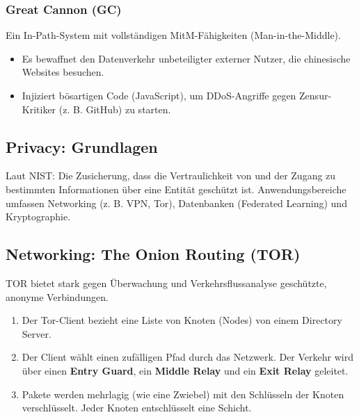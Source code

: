 \documentclass[
../../css_summary.tex,
]{subfiles}
\begin{document}
\subsubsection{Great Cannon (GC)}
Ein In-Path-System mit vollständigen MitM-Fähigkeiten (Man-in-the-Middle).
\begin{itemize}
  \item Es bewaffnet den Datenverkehr unbeteiligter externer Nutzer, die chinesische Websites besuchen.
  \item Injiziert bösartigen Code (JavaScript), um DDoS-Angriffe gegen Zensur-Kritiker (z. B. GitHub) zu starten.
\end{itemize}

\subsection{Privacy: Grundlagen}

\begin{defbox}[Privacy]
  Laut NIST: Die Zusicherung, dass die Vertraulichkeit von und der Zugang zu bestimmten Informationen über eine Entität geschützt ist. Anwendungsbereiche umfassen Networking (z. B. VPN, Tor), Datenbanken (Federated Learning) und Kryptographie.
\end{defbox}

\subsection{Networking: The Onion Routing (TOR)}

TOR bietet stark gegen Überwachung und Verkehrsflussanalyse geschützte, anonyme Verbindungen.

\begin{defbox}
  \begin{enumerate}
    \item Der Tor-Client bezieht eine Liste von Knoten (Nodes) von einem Directory Server.
    \item Der Client wählt einen zufälligen Pfad durch das Netzwerk. Der Verkehr wird über einen \textbf{Entry Guard}, ein \textbf{Middle Relay} und ein \textbf{Exit Relay} geleitet.
    \item Pakete werden mehrlagig (wie eine Zwiebel) mit den Schlüsseln der Knoten verschlüsselt. Jeder Knoten entschlüsselt eine Schicht.
  \end{enumerate}
\end{defbox}
% 
\end{document}
